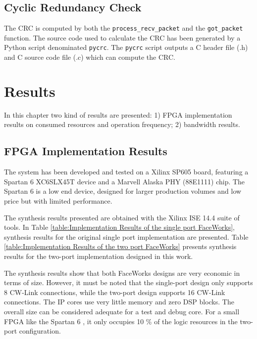 \documentclass[conference]{IEEEtran}
\begin{document}
\subsection{Cyclic Redundancy Check}
\label{subsec:CRC}
The CRC is computed by both the \texttt{process\_recv\_packet} and the \texttt{got\_packet} function. The source code used to calculate the CRC has been generated by a Python script denominated \texttt{pycrc}\cite{pycrc}. The \texttt{pycrc} script outputs a C header file (.h) and C source code file (.c) which can compute the CRC.

\section{Results}

In this chapter two kind of results are presented: 1) FPGA implementation results on consumed resources and operation frequency; 2) bandwidth results.

\subsection{FPGA Implementation Results}

The system has been developed and tested on a Xilinx SP605 board, featuring a Spartan 6 XC6SLX45T device and a Marvell Alaska PHY (88E1111) chip. The Spartan 6 is a low end device, designed for larger production volumes and low price but with limited performance.



The synthesis results presented are obtained with the Xilinx ISE 14.4 suite of tools. In Table \ref{table:Implementation Results of the single port FaceWorks}, synthesis results for the original single port implementation are presented. Table \ref{table:Implementation Results of the two port FaceWorks} presents synthesis results for the two-port implementation designed in this work.




The synthesis results show that both FaceWorks designs are very economic in terms of size. However, it must be noted that the single-port design only supports 8 CW-Link connections, while the two-port design supports 16 CW-Link connections. The IP cores use very little memory and zero DSP blocks. The overall size can be considered adequate for a test and debug core. For a small FPGA like the Spartan 6 , it only occupies 10 \% of the logic resources in the two-port configuration. 
\end{document}
